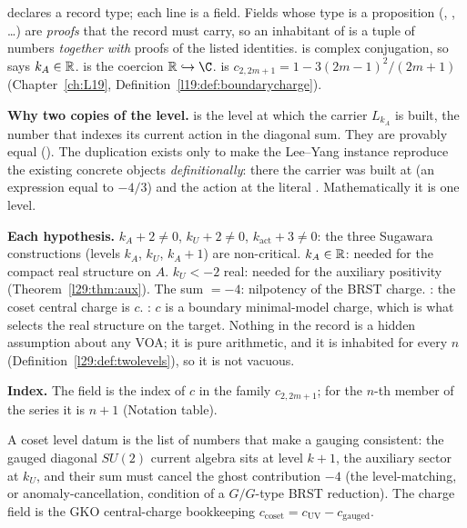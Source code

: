 \begin{dictionary}
 declares a record type; each line  is a field. Fields whose type is a
proposition (, , \dots) are \emph{proofs} that the record must carry, so an
inhabitant of  is a tuple of numbers \emph{together with} proofs of the listed identities.
 is complex conjugation, so  says $k_A\in\mathbb{R}$.  is the coercion
$\ltwentynineR\hookrightarrow\C$.  is $c_{2,2m+1}=1-3(2m-1)^2/(2m+1)$ (Chapter~\ref{ch:L19},
Definition~\ref{l19:def:boundarycharge}).

\textbf{Why two copies of the level.}  is the level at which the carrier $L_{k_A}$ is built, 
the number that indexes its current action in the diagonal sum. They are provably equal (). The
duplication exists only to make the Lee--Yang instance reproduce the existing concrete objects \emph{definitionally}:
there the carrier was built at  (an expression equal to $-4/3$) and the action at the literal
. Mathematically it is one level.

\textbf{Each hypothesis.} $k_A+2\ne0$, $k_U+2\ne0$, $k_{\mathrm{act}}+3\ne0$: the three Sugawara constructions
(levels $k_A$, $k_U$, $k_A+1$) are non-critical. $k_A\in\mathbb{R}$: needed for the compact real structure on $A$.
$k_U<-2$ real: needed for the auxiliary positivity (Theorem~\ref{l29:thm:aux}). The sum $=-4$: nilpotency of the BRST
charge. : the coset central charge is $c$. : $c$ is a boundary minimal-model charge, which
is what selects the real structure on the target. Nothing in the record is a hidden assumption about any VOA; it is
pure arithmetic, and it is inhabited for every $n$ (Definition~\ref{l29:def:twolevels}), so it is not vacuous.

\textbf{Index.} The field  is the index of $c$ in the family $c_{2,2m+1}$; for the $n$-th member of the series
it is $n+1$ (Notation table).
\end{dictionary}

\begin{physics}
A coset level datum is the list of numbers that make a gauging consistent: the gauged diagonal $SU(2)$ current
algebra sits at level $k+1$, the auxiliary sector at $k_U$, and their sum must cancel the ghost contribution $-4$
(the level-matching, or anomaly-cancellation, condition of a $G/G$-type BRST reduction). The charge field is the GKO
central-charge bookkeeping $c_{\mathrm{coset}}=c_{\mathrm{UV}}-c_{\mathrm{gauged}}$.
\end{physics}

